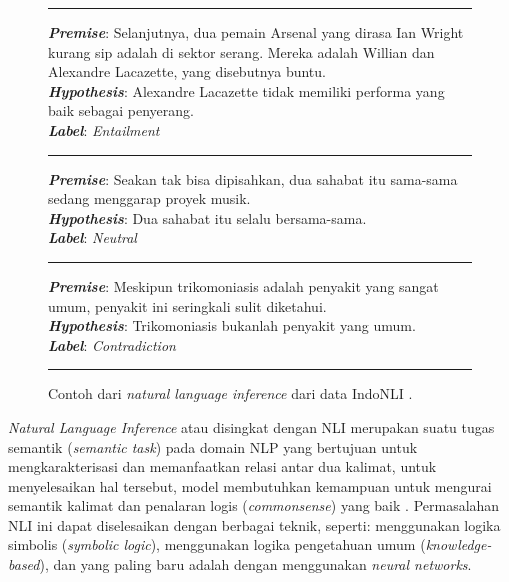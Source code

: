 \begin{figure}[h]
\vspace{3pt}
\hrule
\vspace{3pt}

\textbf{\emph{Premise}}: Selanjutnya, dua pemain Arsenal yang dirasa Ian Wright kurang sip adalah di sektor serang. Mereka adalah Willian dan Alexandre Lacazette, yang disebutnya buntu.\\

\textbf{\emph{Hypothesis}}: Alexandre Lacazette tidak memiliki performa yang baik sebagai penyerang.\\

\textbf{\emph{Label}}:  \emph{Entailment}

\vspace{3pt}
\hrule
\vspace{3pt}

\textbf{\emph{Premise}}: Seakan tak bisa dipisahkan, dua sahabat itu sama-sama sedang menggarap proyek musik.\\

\textbf{\emph{Hypothesis}}: Dua sahabat itu selalu bersama-sama.\\

\textbf{\emph{Label}}:  \emph{Neutral}

\vspace{3pt}
\hrule
\vspace{3pt}

\textbf{\emph{Premise}}: Meskipun trikomoniasis adalah penyakit yang sangat umum, penyakit ini seringkali sulit diketahui.\\

\textbf{\emph{Hypothesis}}: Trikomoniasis bukanlah penyakit yang umum.\\

\textbf{\emph{Label}}:  \emph{Contradiction}

\vspace{5pt}
\hrule
\vspace{5pt}

\centering
\caption{Contoh dari \emph{natural language inference} dari data IndoNLI \citep{mahendra-etal-2021-indonli}.}
\end{figure}

\emph{Natural Language Inference} atau disingkat dengan NLI merupakan suatu tugas semantik (\emph{semantic task}) pada domain NLP yang bertujuan untuk mengkarakterisasi dan memanfaatkan relasi antar dua kalimat, untuk menyelesaikan hal tersebut, model membutuhkan kemampuan untuk mengurai semantik kalimat dan penalaran logis (\emph{commonsense}) yang baik \citep{bowman-etal-2015-large}. Permasalahan NLI ini dapat diselesaikan dengan berbagai teknik, seperti: menggunakan logika simbolis (\emph{symbolic logic}), menggunakan logika pengetahuan umum (\emph{knowledge-based}), dan yang paling baru adalah dengan menggunakan \emph{neural networks}. 

